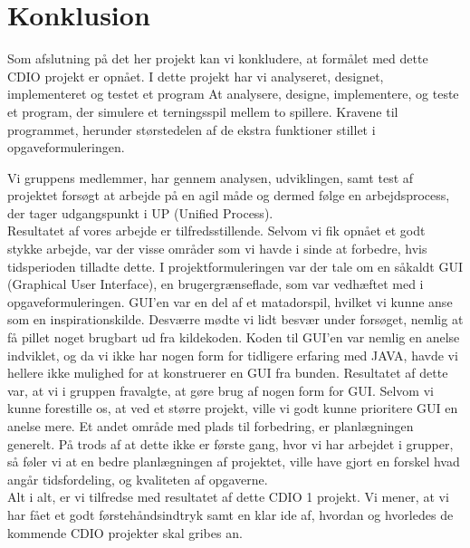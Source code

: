 \chapter{Konklusion}
Som afslutning på det her projekt kan vi konkludere, at formålet med dette CDIO projekt er opnået. 
I dette projekt har vi analyseret, designet, implementeret og testet et program
At analysere, designe, implementere, og teste et program, der simulere et terningsspil mellem to spillere.
Kravene til programmet, herunder størstedelen af de ekstra funktioner stillet i opgaveformuleringen.

Vi gruppens medlemmer, har gennem analysen, udviklingen, samt test af projektet forsøgt at arbejde på en agil måde og dermed følge en arbejdsprocess, der tager udgangspunkt i UP (Unified Process). \\

Resultatet af vores arbejde er tilfredsstillende.
Selvom vi fik opnået et godt stykke arbejde, var der visse områder som vi havde i sinde at forbedre, hvis tidsperioden tilladte dette.
I projektformuleringen var der tale om en såkaldt GUI (Graphical User Interface), en brugergrænseflade, som var vedhæftet med i opgaveformuleringen.
GUI’en var en del af et matadorspil, hvilket vi kunne anse som en inspirationskilde.
Desværre mødte vi lidt besvær under forsøget, nemlig at få pillet noget brugbart ud fra kildekoden.
Koden til GUI’en var nemlig en anelse indviklet, og da vi ikke har nogen form for tidligere erfaring med JAVA, havde vi hellere ikke mulighed for at konstruerer en GUI fra bunden.
Resultatet af dette var, at vi i gruppen fravalgte, at gøre brug af nogen form for GUI.
Selvom vi kunne forestille os, at ved et større projekt, ville vi godt kunne prioritere GUI en anelse mere.
Et andet område med plads til forbedring, er planlægningen generelt. 
På trods af at dette ikke er første gang, hvor vi har arbejdet i grupper, så føler vi at en bedre planlægningen af projektet, ville have gjort en forskel hvad angår tidsfordeling, og kvaliteten af opgaverne. \\

Alt i alt, er vi tilfredse med resultatet af dette CDIO 1 projekt.
Vi mener, at vi har fået et godt førstehåndsindtryk samt en klar ide af, hvordan og hvorledes de kommende CDIO projekter skal gribes an.